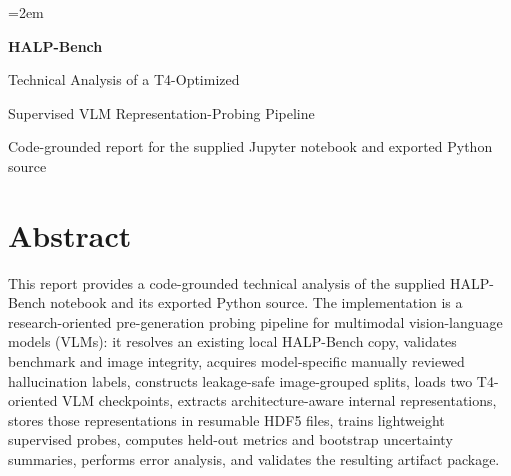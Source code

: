 \documentclass[11pt,a4paper]{article}
\begin{document}
\emergencystretch=2em

\begin{titlepage}

\centering

\vspace*{28mm}

{\Huge\bfseries HALP-Bench\par}

\vspace{5mm}

{\LARGE Technical Analysis of a T4-Optimized\par}

{\LARGE Supervised VLM Representation-Probing Pipeline\par}

\vspace{14mm}

{\large Code-grounded report for the supplied Jupyter notebook and exported Python source\par}

\vfill

\end{titlepage}


\tableofcontents

\clearpage


\setcounter{page}{1}

\section*{Abstract}


This report provides a code-grounded technical analysis of the supplied HALP-Bench notebook and its exported Python source. The implementation is a research-oriented pre-generation probing pipeline for multimodal vision-language models (VLMs): it resolves an existing local HALP-Bench copy, validates benchmark and image integrity, acquires model-specific manually reviewed hallucination labels, constructs leakage-safe image-grouped splits, loads two T4-oriented VLM checkpoints, extracts architecture-aware internal representations, stores those representations in resumable HDF5 files, trains lightweight supervised probes, computes held-out metrics and bootstrap uncertainty summaries, performs error analysis, and validates the resulting artifact package.
\end{document}
